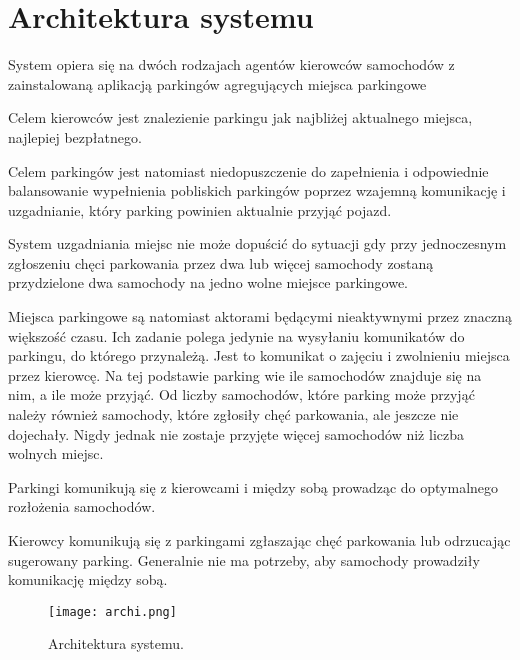 \newpage
\section{Architektura systemu}

System opiera się na dwóch rodzajach agentów
kierowców samochodów z zainstalowaną aplikacją
parkingów agregujących miejsca parkingowe

Celem kierowców jest znalezienie parkingu jak najbliżej aktualnego miejsca, najlepiej bezpłatnego.

Celem parkingów jest natomiast niedopuszczenie do zapełnienia i odpowiednie balansowanie wypełnienia pobliskich parkingów poprzez wzajemną komunikację i uzgadnianie, który parking powinien aktualnie przyjąć pojazd.

System uzgadniania miejsc nie może dopuścić do sytuacji gdy przy jednoczesnym zgłoszeniu chęci parkowania przez dwa lub więcej samochody zostaną przydzielone dwa samochody na jedno wolne miejsce parkingowe.

Miejsca parkingowe są natomiast aktorami będącymi nieaktywnymi przez znaczną większość czasu. Ich zadanie polega jedynie na wysyłaniu komunikatów do parkingu, do którego przynależą. Jest to komunikat o zajęciu i zwolnieniu miejsca przez kierowcę. Na tej podstawie parking wie ile samochodów znajduje się na nim, a ile może przyjąć. Od liczby samochodów, które parking może przyjąć należy również samochody, które zgłosiły chęć parkowania, ale jeszcze nie dojechały. Nigdy jednak nie zostaje przyjęte więcej samochodów niż liczba wolnych miejsc.

Parkingi komunikują się z kierowcami i między sobą prowadząc do optymalnego rozłożenia samochodów.

Kierowcy komunikują się z parkingami zgłaszając chęć parkowania lub odrzucając sugerowany parking. Generalnie nie ma potrzeby, aby samochody prowadziły komunikację między sobą.

\begin{figure}[!h]
    \label{fig:architektura}
    \centering \texttt{[image: archi.png]}
    \caption{Architektura systemu.}
\end{figure}